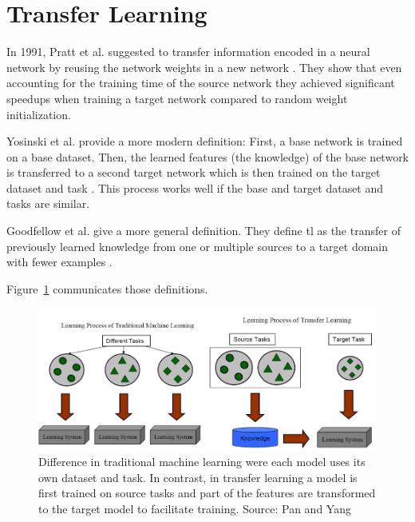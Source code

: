 \section{Transfer Learning}
\label{sec:TransferLearning}

In 1991, Pratt et al. suggested to transfer information encoded in a neural network by reusing the network weights in a new network \cite{Pratt1991}. They show that even accounting for the training time of the source network they achieved significant speedups when training a target network compared to random weight initialization.

Yosinski et al. provide a more modern definition: First, a base network is trained on a base dataset. Then, the learned features {(the knowledge)} of the base network is transferred to a second target network which is then trained on the target dataset and task \cite{Yosinski2014}. This process works well if the base and target dataset and tasks are similar.

Goodfellow et al. give a more general definition. They define \gls{tl} as the transfer of previously learned knowledge from one or multiple sources to a target domain with fewer examples \cite{Goodfellow2016}.

Figure~\ref{fig:03_transferLearning} communicates those definitions. 
\begin{figure}[ht]
	\centering
	\includegraphics[scale=0.55]{figures/03_theory/03_transferLearning}
	\caption{Difference in traditional machine learning were each model uses its own dataset and task. In contrast, in transfer learning a model is first trained on source tasks and part of the features are transformed to the target model to facilitate training. Source: Pan and Yang \cite{Pan2010}}
	\label{fig:03_transferLearning}
\end{figure}

